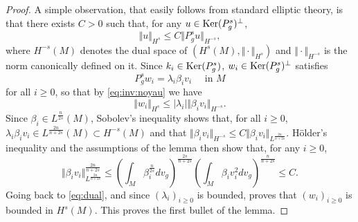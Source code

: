 \documentclass[10pt]{amsart}
\numberwithin{equation}{section}
\def\ker{{\mathop{\rm Ker}}}
\theoremstyle{plain}
\theoremstyle{remark}
\begin{document}
\begin{proof}
A simple observation, that easily follows from standard elliptic theory, is that there exists $C >0$  such that, for any $u \in \ker(P_g^s)^{\perp}$, 
\begin{equation} \label{eq:inv:noyau}
 \Vert u \Vert_{H^s} \le C \Vert P_g^s u \Vert_{H^{-s}},
 \end{equation}
 where $H^{-s}(M)$ denotes the dual space of $(H^s(M), \Vert \cdot \Vert_{H^s})$ and $\Vert \cdot \Vert_{H^{-s}}$ is the norm canonically defined on it. Since $k_i \in \ker(P_g^s)$, $w_i \in \ker(P_g^s)^{\perp}$ satisfies 
\begin{equation} \label{eq:wi}
 P_g^s w_i = \lambda_i \beta_i v_i \quad \text{ in } M 
 \end{equation}
 for all $i \ge 0$, so that by \eqref{eq:inv:noyau} we have 
 \begin{equation} \label{eq:dual}
 \Vert w_i \Vert_{H^s} \le |\lambda_i| \Vert  \beta_i v_i \Vert_{H^{-s}}.
 \end{equation} Since $\beta_i \in L^{\frac{n}{2s}}(M)$, Sobolev's inequality  shows that, for all $i \ge 0$, $\lambda_i \beta_i v_i \in L^{\frac{2n}{n+2s}}(M) \subset H^{-s}(M)$ and that $  \Vert \beta_i v_i \Vert_{H^{-s}} \le C \Vert \beta_i v_i \Vert_{L^{\frac{2n}{n+2s}}}$. H\"older's inequality and the assumptions of the lemma then show that, for any $ i \ge 0$, 
 \begin{equation*}
   \Vert \beta_i v_i \Vert_{L^{\frac{2n}{n+2s}}}^{\frac{2n}{n+2s}}   \le \left( \int_M \beta_i^{\frac{n}{2s}}dv_g \right)^{\frac{2s}{n+2s}} \left( \int_M \beta_i v_i^2 dv_g \right)^{\frac{n}{n+2s}} \le C. 
   \end{equation*} 
Going back to   \eqref{eq:dual}, and since $(\lambda_i)_{i\ge 0}$ is bounded, proves that $(w_i)_{i\ge0}$ is bounded in $H^s(M)$. This proves the first bullet of the lemma.


\end{proof}
\end{document}
